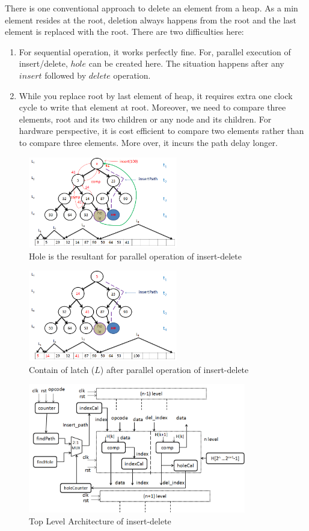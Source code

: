 \documentclass[10pt, conference, compsocconf]{IEEEtran}
\begin{document}
There is one conventional approach to delete an element from a heap.
As a min element resides at the root, deletion always happens from the root and the last element is replaced with the root. There are two difficulties here:

\begin{enumerate}
\item For sequential operation, it works perfectly fine. For, parallel execution of insert/delete, $hole$ can be created here. The situation happens after any $insert$ followed by $delete$ operation.
\item While you replace root by last element of heap, it requires extra one clock cycle to write that element at root. Moreover, we need to compare three elements, root and its two children or any node and its children. For hardware perspective, it is cost efficient to compare two elements rather than to compare three elements. More over, it incurs the path delay longer.
\end{enumerate}


\begin{figure}[!ht]
  \centering
  \includegraphics[width=6.5cm]{Figures/8.png}
      \caption{Hole is the resultant for parallel operation of insert-delete}
    \label{fig8}
\end{figure}

\begin{figure}[!ht]
  \centering
  \includegraphics[width=6.5cm]{Figures/9.png}
      \caption{Contain of latch ($L$) after parallel operation of insert-delete}
    \label{fig9}
\end{figure}

\begin{figure}[!ht]
  \centering
  \includegraphics[width=9.5cm]{Figures/2.png}
      \caption{Top Level Architecture of insert-delete}
    \label{fig10}
\end{figure}
\end{document}
